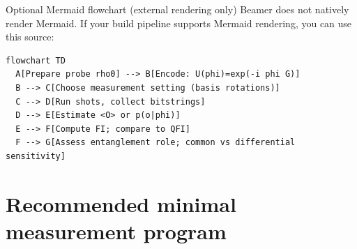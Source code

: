 \documentclass[aspectratio=169]{beamer}
\begin{document}
\begin{frame}[fragile]{Optional Mermaid flowchart (external rendering only)}
\small
Beamer does not natively render Mermaid. If your build pipeline supports Mermaid rendering,
you can use this source:

\begin{lstlisting}
flowchart TD
  A[Prepare probe rho0] --> B[Encode: U(phi)=exp(-i phi G)]
  B --> C[Choose measurement setting (basis rotations)]
  C --> D[Run shots, collect bitstrings]
  D --> E[Estimate <O> or p(o|phi)]
  E --> F[Compute FI; compare to QFI]
  F --> G[Assess entanglement role; common vs differential sensitivity]
\end{lstlisting}
\end{frame}

\section{Recommended minimal measurement program}
\end{document}
